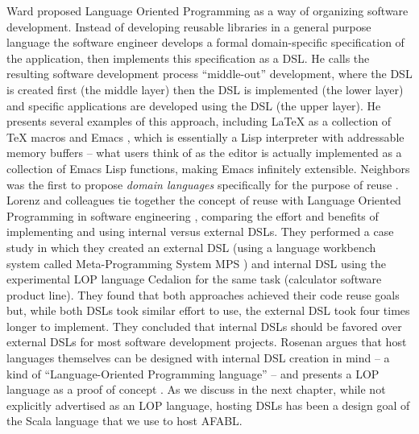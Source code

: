 Ward \cite{ward1994language} proposed Language Oriented Programming as a way of organizing software development. Instead of developing reusable libraries in a general purpose language the software engineer develops a formal domain-specific specification of the application, then implements this specification as a DSL. He calls the resulting software development process ``middle-out'' development, where the DSL is created first (the middle layer) then the DSL is implemented (the lower layer) and specific applications are developed using the DSL (the upper layer). He presents several examples of this approach, including \LaTeX \cite{lamport1986document} as a collection of \TeX \cite{knuth1984texbook} macros and Emacs \cite{stallman2014emacs}, which is essentially a Lisp interpreter with addressable memory buffers -- what users think of as the editor is actually implemented as a collection of Emacs Lisp functions, making Emacs infinitely extensible.
Neighbors was the first to propose {\it domain languages} specifically for the purpose of reuse \cite{neighbors1984draco}. Lorenz and colleagues tie together the concept of reuse with Language Oriented Programming in software engineering \cite{lorenz2011a-code}, comparing the effort and benefits of implementing and using internal versus external DSLs. They performed a case study in which they created an external DSL (using a language workbench system called Meta-Programming System MPS \cite{dmitriev2004language}) and internal DSL using the experimental LOP language Cedalion \cite{rosenan2010designing} for the same task (calculator software product line). They found that both approaches achieved their code reuse goals but, while both DSLs took similar effort to use, the external DSL took four times longer to implement. They concluded that internal DSLs should be favored over external DSLs for most software development projects. Rosenan argues that host languages themselves can be designed with internal DSL creation in mind -- a kind of ``Language-Oriented Programming language'' -- and presents a LOP language as a proof of concept \cite{rosenan2010designing}. As we discuss in the next chapter, while not explicitly advertised as an LOP language, hosting DSLs has been a design goal of the Scala language that we use to host AFABL.








